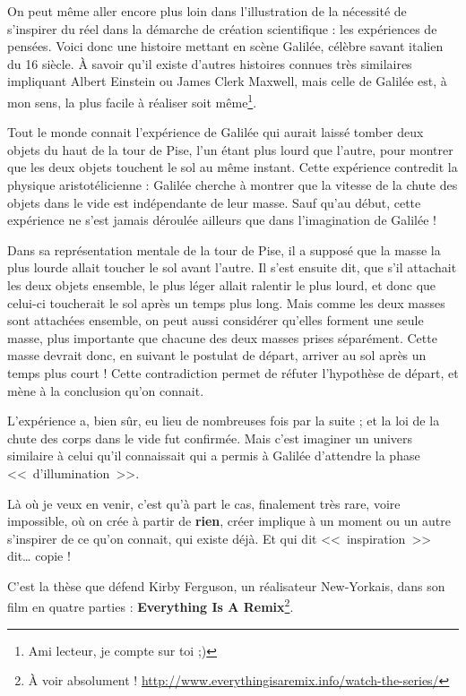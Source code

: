 On peut même aller encore plus loin dans l'illustration de la nécessité de s'inspirer du réel dans la démarche de création scientifique : les expériences de pensées.
Voici donc une histoire mettant en scène Galilée, célèbre savant italien du 16\ieme{} siècle.
À savoir qu'il existe d'autres histoires connues très similaires impliquant Albert Einstein ou James Clerk Maxwell, mais celle de Galilée est, à mon sens, la plus facile à réaliser soit même\footnote{Ami lecteur, je compte sur toi ;)}.

Tout le monde connait l'expérience de Galilée qui aurait laissé tomber deux objets du haut de la tour de Pise, l'un étant plus lourd que l'autre, pour montrer que les deux objets touchent le sol au même instant.
Cette expérience contredit la physique aristotélicienne : Galilée cherche à montrer que la vitesse de la chute des objets dans le vide est indépendante de leur masse.
Sauf qu'au début, cette expérience ne s'est jamais déroulée ailleurs que dans l'imagination de Galilée !

Dans sa représentation mentale de la tour de Pise, il a supposé que la masse la plus lourde allait toucher le sol avant l'autre.
Il s'est ensuite dit, que s'il attachait les deux objets ensemble, le plus léger allait ralentir le plus lourd, et donc que celui-ci toucherait le sol après un temps plus long.
Mais comme les deux masses sont attachées ensemble, on peut aussi considérer qu'elles forment une seule masse, plus importante que chacune des deux masses prises séparément.
Cette masse devrait donc, en suivant le postulat de départ, arriver au sol après un temps plus court !
Cette contradiction permet de réfuter l'hypothèse de départ, et mène à la conclusion qu'on connait.

L'expérience a, bien sûr, eu lieu de nombreuses fois par la suite ; et la loi de la chute des corps dans le vide fut confirmée.
Mais c'est imaginer un univers similaire à celui qu'il connaissait qui a permis à Galilée d'attendre la phase <<~d'illumination~>>.

Là où je veux en venir, c'est qu'à part le cas, finalement très rare, voire impossible, où on crée à partir de \textbf{rien}, créer implique à un moment ou un autre s'inspirer de ce qu'on connait, qui existe déjà.
Et qui dit <<~inspiration~>> dit\dots{} copie !

C'est la thèse que défend Kirby Ferguson, un réalisateur New-Yorkais, dans son film en quatre parties : \textbf{Everything Is A Remix}\footnote{À voir absolument ! \url{http://www.everythingisaremix.info/watch-the-series/}}.

